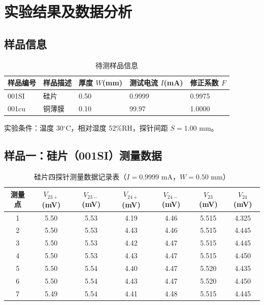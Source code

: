 \section{实验结果及数据分析}

\subsection{样品信息}

\begin{table}[H]
    \centering
    \caption{待测样品信息}
    \begin{tabular}{p{2cm}p{3cm}p{2cm}p{2.5cm}p{2.5cm}}
        \toprule
        样品编号 & 样品描述 & 厚度 $W$(mm) & 测试电流 $I$(mA) & 修正系数 $F$ \\
        \midrule
        001SI & 硅片 & 0.50 & 0.9999 & 0.9975 \\
        001cu & 铜薄膜 & 0.10 & 99.97 & 1.0000 \\
        \bottomrule
    \end{tabular}
\end{table}

实验条件：温度 30$^\circ$C，相对湿度 52\%RH，探针间距 $S = 1.00$ mm。

\subsection{样品一：硅片（001SI）测量数据}

\begin{table}[H]
    \centering
    \caption{硅片四探针测量数据记录表（$I = 0.9999$ mA，$W = 0.50$ mm）}
    \begin{tabular}{ccccccc}
        \toprule
        测量点 & $V_{23+}$(mV) & $V_{23-}$(mV) & $V_{24+}$(mV) & $V_{24-}$(mV) & $V_{23}$(mV) & $V_{24}$(mV) \\
        \midrule
        1 & 5.50 & 5.53 & 4.19 & 4.46 & 5.515 & 4.325 \\
        2 & 5.50 & 5.53 & 4.43 & 4.46 & 5.515 & 4.445 \\
        3 & 5.50 & 5.53 & 4.42 & 4.47 & 5.515 & 4.445 \\
        4 & 5.50 & 5.53 & 4.43 & 4.47 & 5.515 & 4.450 \\
        5 & 5.50 & 5.54 & 4.40 & 4.47 & 5.520 & 4.435 \\
        6 & 5.50 & 5.54 & 4.43 & 4.47 & 5.520 & 4.450 \\
        7 & 5.49 & 5.54 & 4.41 & 4.48 & 5.515 & 4.445 \\
        \bottomrule
    \end{tabular}
\end{table}

